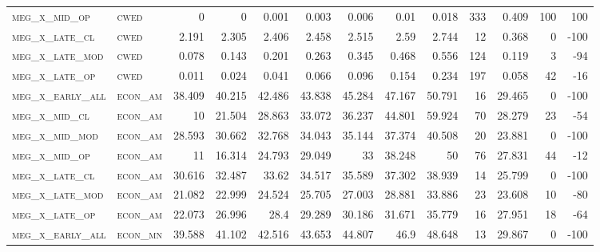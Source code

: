 \begin{landscape}
\begin{center}
\begin{footnotesize}
\begin{longtable}{llrrrrrrrr|rrr}
\textsc{meg\_x\_mid\_op   } & \textsc{cwed      }   & 0        & 0        & 0.001    & 0.003    & 0.006    & 0.01     & 0.018     & 333    & 0.409         & 100           & 100             \\
\textsc{meg\_x\_late\_cl  } & \textsc{cwed      }   & 2.191    & 2.305    & 2.406    & 2.458    & 2.515    & 2.59     & 2.744     & 12     & 0.368         & 0             & -100            \\
\textsc{meg\_x\_late\_mod } & \textsc{cwed      }   & 0.078    & 0.143    & 0.201    & 0.263    & 0.345    & 0.468    & 0.556     & 124    & 0.119         & 3             & -94             \\
\textsc{meg\_x\_late\_op  } & \textsc{cwed      }   & 0.011    & 0.024    & 0.041    & 0.066    & 0.096    & 0.154    & 0.234     & 197    & 0.058         & 42            & -16             \\
\textsc{meg\_x\_early\_all} & \textsc{econ\_am  }   & 38.409   & 40.215   & 42.486   & 43.838   & 45.284   & 47.167   & 50.791    & 16     & 29.465        & 0             & -100            \\
\textsc{meg\_x\_mid\_cl   } & \textsc{econ\_am  }   & 10       & 21.504   & 28.863   & 33.072   & 36.237   & 44.801   & 59.924    & 70     & 28.279        & 23            & -54             \\
\textsc{meg\_x\_mid\_mod  } & \textsc{econ\_am  }   & 28.593   & 30.662   & 32.768   & 34.043   & 35.144   & 37.374   & 40.508    & 20     & 23.881        & 0             & -100            \\
\textsc{meg\_x\_mid\_op   } & \textsc{econ\_am  }   & 11       & 16.314   & 24.793   & 29.049   & 33       & 38.248   & 50        & 76     & 27.831        & 44            & -12             \\
\textsc{meg\_x\_late\_cl  } & \textsc{econ\_am  }   & 30.616   & 32.487   & 33.62    & 34.517   & 35.589   & 37.302   & 38.939    & 14     & 25.799        & 0             & -100            \\
\textsc{meg\_x\_late\_mod } & \textsc{econ\_am  }   & 21.082   & 22.999   & 24.524   & 25.705   & 27.003   & 28.881   & 33.886    & 23     & 23.608        & 10            & -80             \\
\textsc{meg\_x\_late\_op  } & \textsc{econ\_am  }   & 22.073   & 26.996   & 28.4     & 29.289   & 30.186   & 31.671   & 35.779    & 16     & 27.951        & 18            & -64             \\
\textsc{meg\_x\_early\_all} & \textsc{econ\_mn  }   & 39.588   & 41.102   & 42.516   & 43.653   & 44.807   & 46.9     & 48.648    & 13     & 29.867        & 0             & -100            \\

\end{longtable}
\end{footnotesize}
\end{center}
\end{landscape}
